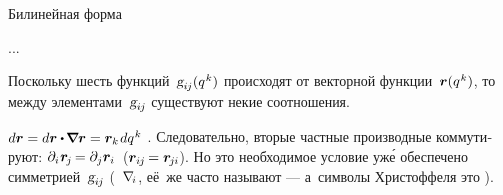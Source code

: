 \begin{otherlanguage}{russian}
Билинейная форма

\nopagebreak ...

Поскольку шесть функций~${\textsl{g}_{i\hspace{-0.1ex}j}(q^{\hspace{.1ex}k})}$ происходят от векторной функции~${\bm{r}(q^{\hspace{.1ex}k})}$, то между элементами~$\textsl{g}_{i\hspace{-0.1ex}j}$ существуют некие соотношения.

 ${d\bm{r} = d\bm{r} \dotp \hspace{-0.2ex} \tikzmark{beginItsUnitTensorE} \boldnabla \bm{r} \tikzmark{endItsUnitTensorE} = \bm{r}_k \hspace{0.2ex} dq^{\hspace{.1ex}k}}$\ru{\:---} . Следовательно, вторые частные производные коммутируют: ${\partial_i \hspace{.12ex} \bm{r}_{\hspace{-0.2ex}j} \hspace{-0.2ex} = \partial_j \bm{r}_i}$~(${\bm{r}_{i\hspace{-0.1ex}j} \hspace{-0.2ex} = \bm{r}_{\hspace{-0.2ex}j\hspace{-0.06ex}i}}$).
Но это необходимое условие уж\'{е} обеспечено симметрией~${\textsl{g}_{i\hspace{-0.1ex}j}}$ (~$\nabla_{\hspace{-0.32ex}i\hspace{.1ex}}$, её~же часто называют \:--- а~символы Христоффеля это  ).


\end{otherlanguage}
